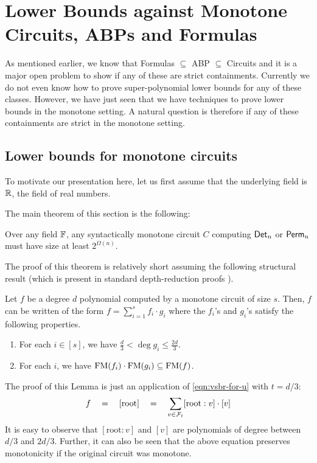 \chapter{Lower Bounds against Monotone Circuits, ABPs and Formulas}\label{chap:monABPCktSep}

\newcommand{\MonChi}{\operatorname{Mon}}
\newcommand{\EIP}{\operatorname{EIP}}

As mentioned earlier, we know that Formulas $\subseteq$ ABP $\subseteq$ Circuits and it is a major open problem to show if any of these are strict containments.
Currently we do not even know how to prove super-polynomial lower bounds for any of these classes.
However, we have just seen that we have techniques to prove lower bounds in the monotone setting.
A natural question is therefore if any of these containments are strict in the monotone setting. 

\section{Lower bounds for monotone circuits}
\label{sec:monotone-ckts}
To motivate our presentation here, let us first assume that the underlying field is $\mathbb{R}$, the field of real numbers. 
	
	
The main theorem of this section is the following: 

\begin{theorem}[\cite{js82}]\label{thm:monotone-circuit-lbs}
  Over any field $\mathbb{F}$, any syntactically monotone circuit $C$ computing $\operatorname{\mathsf{Det}}_n$ or $\operatorname{\mathsf{Perm}}_n$ must have size at least $2^{\Omega(n)}$.
\end{theorem}

The proof of this theorem is relatively short assuming the following structural result (which is present in standard depth-reduction proofs \cite{vsbr83,ajmv98}).

\begin{lemma}\label{lem:vsbr-two-thirds}
  Let $f$ be a degree $d$ polynomial computed by a monotone circuit of size $s$. 
Then, $f$ can be written of the form $f = \sum_{i=1}^s f_i \cdot g_i$ where the $f_i$'s and $g_i$'s satisfy the following properties.
\begin{enumerate}
\item For each $i\in [s]$, we have $\frac{d}{3} < \deg{g_i} \leq
  \frac{2d}{3}$.
\item For each $i$, we have $\mathrm{FM}(f_i)\cdot \mathrm{FM}(g_i) \subseteq \mathrm{FM}(f)$.
\end{enumerate}
\end{lemma}
\begin{proof-sketch}
The proof of this Lemma is just an application of \eqref{eqn:vsbr-for-u} with $t = d/3$: 
\[
f\quad = \quad [\mathrm{root}] \quad = \quad \sum_{v\in \mathcal{F}_t} [\mathrm{root}:v] \cdot [v]
\]
It is easy to observe that $[\mathrm{root}:v]$ and $[v]$ are polynomials of degree between $d/3$ and $2d/3$. 
Further, it can also be seen that the above equation  preserves monotonicity if the original circuit was monotone. 
\end{proof-sketch}


